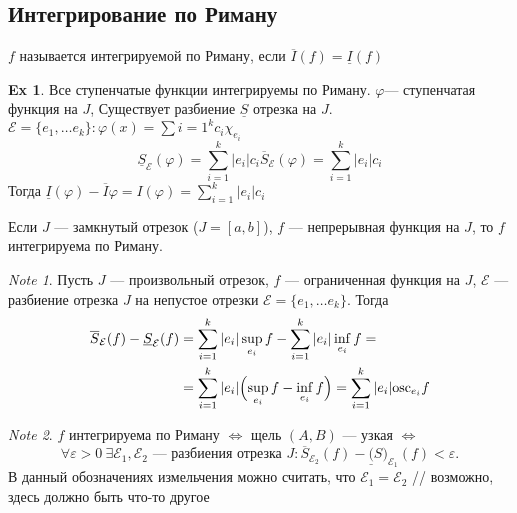 \documentclass[11pt]{book}
\newcommand{\slim}{\sum\limits}
\newcommand{\osc}{{\mathop{\text{\rm osc}}}}
\theoremstyle{definition}
\theoremstyle{plain}
\theoremstyle{plain}
\theoremstyle{definition}
\newtheorem*{ex}{Ex}
\theoremstyle{remark}
\newtheorem*{note}{Note}
\begin{document}
\subsection{Интегрирование по Риману}
\begin{defn}
    $ f$ называется интегрируемой по Риману, если $ \overline{I}(f) = \underline{I}(f)$
\end{defn}
\begin{ex}
\item Все ступенчатые функции интегрируемы по Риману.
    $\varphi $--- ступенчатая функция на $ J$,
    Существует разбиение $ \underline{S}$ отрезка на $ J$.
    $ \mathcal{E} = \{e_1, \ldots  e_k\} : \varphi  (x) = \slim{i=1}^{k} c_i \chi_{e_i}$
    \[
	\underline{S}_{\mathcal{E}}( \varphi ) = \slim_{i=1}^{k} |e_i| c_i
	\overline{S}_{\mathcal{E}}( \varphi ) = \slim_{i=1}^{k} |e_i| c_i
    \]
    Тогда $ \underline{I} ( \varphi ) - \overline{I} \varphi = I( \varphi ) = \slim_{i=1}^{k} |e_i| c_i$
\end{ex}
\begin{thm}
    Если $ J$ --- замкнутый отрезок ($ J = [a, b]$), $ f$ --- непрерывная функция на $ J$, то $ f$ интегрируема по Риману.
\end{thm}
\begin{note}
    Пусть $ J$ --- произвольный отрезок, $ f$ --- ограниченная функция на $ J$, $ \mathcal{E}$ --- разбиение отрезка $ J  $ на непустое отрезки $ \mathcal{E} =\{e_1, \ldots  e_k\}$.
    Тогда
    \begin{align*}
	\overline{S}_{\mathcal{E}}(f)  - \underline{S}_{\mathcal{E}}(f) &= \sum_{i=1}^{k} |e_i|\sup_{e_i}f  - \sum_{i=1}^{k}|e_i|\inf_{e_i}f = \\
									&= \sum_{i=1}^{k}|e_i|\Bigl( \sup_{e_i} f - \inf_{e_i}f\Bigr) = \sum_{i=1}^{k} |e_i| \osc_{e_i}f
    \end{align*}
\end{note}
\begin{note}
    $ f$ интегрируема по Риману  $ \Longleftrightarrow $  щель $ (A, B)$ --- узкая $ \Longleftrightarrow $
    \[
	\forall \varepsilon >0 ~ \exists  \mathcal{E}_1, \mathcal{E}_2 \text{ --- разбиения отрезка } J: \overline{S}_{\mathcal{E}_2}(f)  - \underline(S)_{\mathcal{E}_1}(f)  < \varepsilon
    .\]
    В данный обозначениях измельчения можно считать, что $ \mathcal{E}_1 = \mathcal{E}_2$
    // возможно, здесь должно быть что-то другое
\end{note}
\end{document}
